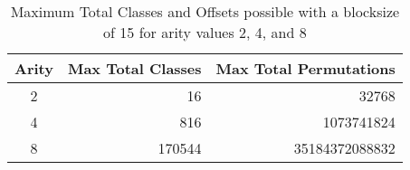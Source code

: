 \begin{table}[h]
\begin{center}
\begin{tabular}{crr}
\toprule
Arity & \multicolumn{1}{c}{Max Total Classes} &
\multicolumn{1}{c}{Max Total Permutations}\\
\midrule
2 & 16 & 32768\\
4 & 816 & 1073741824\\
8 & 170544 & 35184372088832\\
\bottomrule
\end{tabular}
\caption{Maximum Total Classes and Offsets possible with a blocksize of 15 for arity 
    values 2, 4, and 8}
\label{tab:maxclass}
\end{center}
\end{table}
